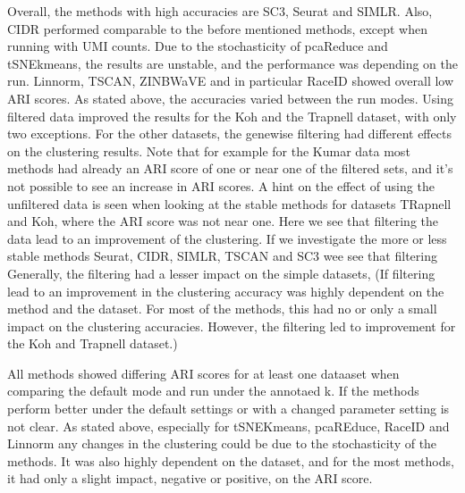 \documentclass[11pt, a4paper]{article}\usepackage[]{graphicx}\usepackage[]{color}
\begin{document}
Overall, the methods with high accuracies are SC3, Seurat and SIMLR. Also, CIDR performed comparable to the before mentioned methods, except when running with UMI counts. Due to the stochasticity of pcaReduce and tSNEkmeans, the results are unstable, and the performance was depending on the run. Linnorm, TSCAN, ZINBWaVE and in particular RaceID showed overall low ARI scores.
As stated above, the accuracies varied between the run modes. Using filtered data improved the results for the Koh and the Trapnell dataset, with only two exceptions. For the other datasets, the genewise filtering had different effects on the clustering results. Note that for example for the Kumar data most methods had already an ARI score of one or near one of the filtered sets, and it's not possible to see an increase in ARI scores. A hint on the effect of using the unfiltered data is seen when looking at the stable methods for datasets TRapnell and Koh, where the ARI score was not near one. Here we see that filtering the data lead to an improvement of the clustering. 
If we investigate the more or less stable methods Seurat, CIDR, SIMLR, TSCAN and SC3 wee see that filtering 
Generally,  the filtering had a lesser impact on the simple datasets,
 (If filtering lead to an improvement in the clustering accuracy was highly dependent on the method and the dataset. For most of the methods, this had no or only a small impact on the clustering accuracies. However, the filtering led to improvement for the Koh and Trapnell dataset.)


All methods showed differing ARI scores for at least one dataaset when comparing the default mode and run under the annotaed k. If the methods perform better under the default settings or with a changed parameter setting is not clear. As stated above,  especially for tSNEKmeans, pcaREduce, RaceID and Linnorm any changes in the clustering could be due to the stochasticity of the methods. It was also highly dependent on the dataset, and for the most methods, it had only a slight impact, negative or positive, on the ARI score. 
\end{document}
